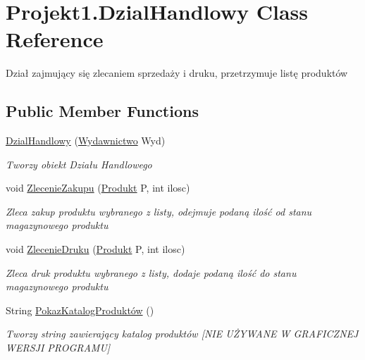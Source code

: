 \hypertarget{class_projekt1_1_1_dzial_handlowy}{}\section{Projekt1.\+Dzial\+Handlowy Class Reference}
\label{class_projekt1_1_1_dzial_handlowy}


Dział zajmujący się zlecaniem sprzedaży i druku, przetrzymuje listę produktów  


\subsection*{Public Member Functions}
\begin{DoxyCompactItemize}
\item 
\mbox{\hyperlink{class_projekt1_1_1_dzial_handlowy_ad5c7110f56857cc32a3dfaf0811d72a4}{Dzial\+Handlowy}} (\mbox{\hyperlink{class_projekt1_1_1_wydawnictwo}{Wydawnictwo}} Wyd)
\begin{DoxyCompactList}\small\item\em Tworzy obiekt Działu Handlowego \end{DoxyCompactList}\item 
void \mbox{\hyperlink{class_projekt1_1_1_dzial_handlowy_acd312cb8369482f492936c642ef5170f}{Zlecenie\+Zakupu}} (\mbox{\hyperlink{class_projekt1_1_1_produkt}{Produkt}} P, int ilosc)
\begin{DoxyCompactList}\small\item\em Zleca zakup produktu wybranego z listy, odejmuje podaną ilość od stanu magazynowego produktu \end{DoxyCompactList}\item 
void \mbox{\hyperlink{class_projekt1_1_1_dzial_handlowy_a42c78f53cf41e75b39498a7da96e7bc3}{Zlecenie\+Druku}} (\mbox{\hyperlink{class_projekt1_1_1_produkt}{Produkt}} P, int ilosc)
\begin{DoxyCompactList}\small\item\em Zleca druk produktu wybranego z listy, dodaje podaną ilość do stanu magazynowego produktu \end{DoxyCompactList}\item 
String \mbox{\hyperlink{class_projekt1_1_1_dzial_handlowy_ab9f6e28c74e71c9348c1f03b731c71c1}{Pokaz\+Katalog\+Produktów}} ()
\begin{DoxyCompactList}\small\item\em Tworzy string zawierający katalog produktów \mbox{[}N\+IE UŻ\+Y\+W\+A\+NE W G\+R\+A\+F\+I\+C\+Z\+N\+EJ W\+E\+R\+S\+JI P\+R\+O\+G\+R\+A\+MU\mbox{]} \end{DoxyCompactList}\end{DoxyCompactItemize}
